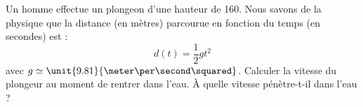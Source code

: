
\begin{exercice}\label{exosmath-0374}

    Un homme effectue un plongeon d'une hauteur de \unit{160}{\meter}. Nous savons de la physique que la distance (en mètres) parcourue en fonction du temps (en secondes) est :
    \begin{equation}
        d(t)=\frac{ 1 }{2}gt^2
    \end{equation}
    avec \( g\simeq\unit{9.81}{\meter\per\second\squared}\). Calculer la vitesse du plongeur au moment de rentrer dans l'eau. À quelle vitesse pénètre-t-il dans l'eau ?

\end{exercice}

